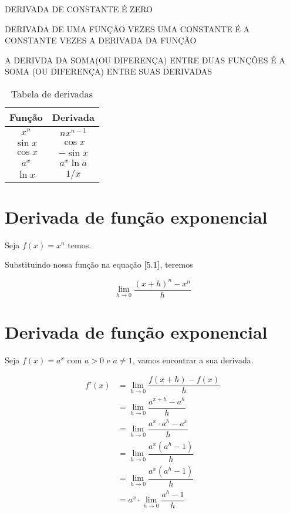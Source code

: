 DERIVADA DE CONSTANTE É ZERO

DERIVADA DE UMA FUNÇÃO VEZES UMA CONSTANTE É A CONSTANTE VEZES A DERIVADA DA FUNÇÃO

A DERIVDA DA SOMA(OU DIFERENÇA) ENTRE DUAS FUNÇÕES É A SOMA (OU DIFERENÇA) ENTRE SUAS DERIVADAS

\begin{table}[h]
    \centering
    \begin{tabular}{|c|c|}
    \hline
    Função & Derivada \\
    \hline
    $x^n$  & $nx^{n-1}$ \\
    \hline
    $\sin x $ & $\cos x$\\
    \hline
    $\cos x$ & $-\sin x$\\
    \hline
    $a^x$ & $a^x \ln a$\\
    \hline
    $\ln x$ & $1/x$ \\
        \hline
    \end{tabular}
    \caption{Tabela de derivadas}
    \label{tab:my_label}
\end{table}

\section{Derivada de função exponencial}

Seja $f(x)=x^n$ temos.

Substituindo nossa função na equação $\eqref{5.1}$, teremos

\begin{equation}\label{5.2}
    \lim_{h \to 0} \dfrac{(x+h)^n-x^n}{h}
\end{equation}

\section{Derivada de função exponencial}

Seja $f(x)=a^x$ com $a>0$ e $a\not= 1$, vamos encontrar a sua derivada.

\begin{equation}\label{5.3}
\begin{split}
f'(x)&=\lim_{h \to 0}\dfrac{f(x+h)-f(x)}{h}\\
&=\lim_{h \to 0}\dfrac{a^{x+h}-a^h}{h}\\
&=\lim_{h \to 0}\dfrac{a^x\cdot a^h-a^x}{h}\\
&=\lim_{h \to 0}\dfrac{a^x(a^h-1)}{h}\\
&=\lim_{h \to 0}\dfrac{a^x(a^h-1)}{h}\\
&=a^x\cdot \lim_{h \to 0}\dfrac{a^h-1}{h}
\end{split}
\end{equation}

